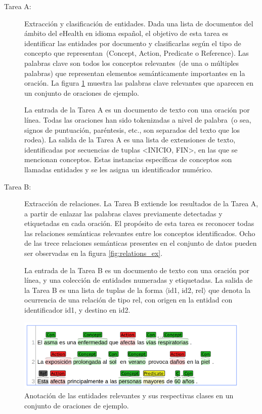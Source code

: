 \begin{description}
	\item[Tarea A:] Extracción y clasificación de entidades.
	Dada una lista de documentos del ámbito del eHealth en idioma español, el objetivo de	esta tarea es identificar las entidades por documento y clasificarlas según el tipo de concepto que representan~(Concept, Action, Predicate o Reference).
	Las palabras clave son todos los conceptos relevantes~(de una o múltiples palabras) que representan elementos
	semánticamente importantes en la oración.
	La figura \ref{fig:entites_ex} muestra las palabras clave relevantes que aparecen en un conjunto de oraciones de ejemplo.
	
	La entrada de la Tarea A es un documento de texto con una oración	por línea. Todas las oraciones han sido tokenizadas a nivel de palabra~(o sea, signos de puntuación, paréntesis, etc., son separados del texto que los rodea).
	La salida de la Tarea A es una lista de extensiones de texto, identificadas por secuencias de tuplas <INICIO, FIN>, en las que se mencionan conceptos.
	Estas instancias específicas de conceptos son llamadas entidades y se les asigna un identificador numérico.
	
	\item[Tarea B:] Extracción de relaciones.
	La Tarea B extiende los resultados de la Tarea A, a partir de enlazar las palabras claves previamente detectadas y etiquetadas en cada oración.
	El propósito de esta tarea es reconocer todas las relaciones semánticas relevantes entre los conceptos identificados.
	Ocho de las trece relaciones semánticas presentes en el conjunto de datos pueden ser observadas en la figura \ref{fig:relations_ex}.
		
	La entrada de la Tarea B es un documento de texto con una oración	por línea, y una colección de entidades numeradas y etiquetadas.
	La salida de la Tarea B es una lista de tuplas de la forma $\langle$id1, id2, rel$\rangle$ que denota la ocurrencia de una relación de tipo rel, con origen en la entidad con identificador id1, y destino en id2.
	
\end{description} 
	
\begin{figure}[h!]
	\centering
	\includegraphics[width=0.9\linewidth]{Graphics/entities.png}
	\caption{Anotación de las entidades relevantes y sus respectivas clases en un conjunto de oraciones de ejemplo.} \label{fig:entites_ex}
\end{figure}

